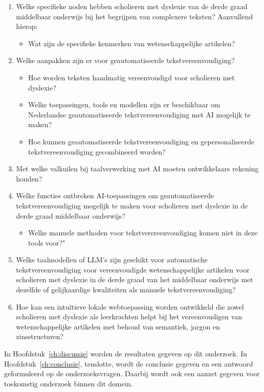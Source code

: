\begin{enumerate}
	\item Welke specifieke noden hebben scholieren met dyslexie van de derde graad middelbaar onderwijs bij het begrijpen van complexere teksten? Aanvullend hierop: 
	\begin{itemize}
		\item Wat zijn de specifieke kenmerken van wetenschappelijke artikelen?
	\end{itemize} 
	\item Welke aanpakken zijn er voor geautomatiseerde tekstvereenvoudiging?
	\begin{itemize}
		\item Hoe worden teksten handmatig vereenvoudigd voor scholieren met dyslexie?
		\item Welke toepassingen, tools en modellen zijn er beschikbaar om Nederlandse geautomatiseerde tekstvereenvoudiging met AI mogelijk te maken?
		\item Hoe kunnen geautomatiseerde tekstvereenvoudiging en gepersonaliseerde tekstvereenvoudiging gecombineerd worden?
	\end{itemize}
	\item Met welke valkuilen bij taalverwerking met AI moeten ontwikkelaars rekening houden?
	\item Welke functies ontbreken AI-toepassingen om geautomatiseerde tekstvereenvoudiging mogelijk te maken voor scholieren met dyslexie in de derde graad middelbaar onderwijs? 
	\begin{itemize}
		\item Welke manuele methoden voor tekstverereenvoudiging komen niet in deze tools voor?"
	\end{itemize}
	\item Welke taalmodellen of LLM's zijn geschikt voor automatische tekstvereenvoudiging voor vereenvoudigde wetenschappelijke artikelen voor scholieren met dyslexie in de derde graad van het middelbaar onderwijs met dezelfde of gelijkaardige kwaliteiten als manuele tekstvereenvoudiging?
	\item Hoe kan een intuïtieve lokale webtoepassing worden ontwikkeld die zowel scholieren met dyslexie als leerkrachten helpt bij het vereenvoudigen van wetenschappelijke artikelen met behoud van semantiek, jargon en zinsstructuren?
\end{enumerate}

In Hoofdstuk~\ref{ch:discussie} worden de resultaten gegeven op dit onderzoek. In Hoofdstuk~\ref{ch:conclusie}, tenslotte, wordt de conclusie gegeven en een antwoord geformuleerd op de onderzoeksvragen. Daarbij wordt ook een aanzet gegeven voor toekomstig onderzoek binnen dit domein.